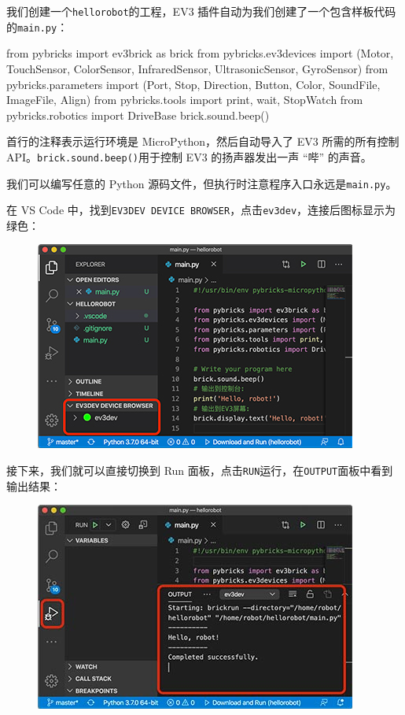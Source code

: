 我们创建一个\texttt{hellorobot}的工程，EV3
插件自动为我们创建了一个包含样板代码的\texttt{main.py}：

\begin{pythoncode}
from pybricks import ev3brick as brick
from pybricks.ev3devices import (Motor, TouchSensor, ColorSensor, InfraredSensor, UltrasonicSensor, GyroSensor)
from pybricks.parameters import (Port, Stop, Direction, Button, Color, SoundFile, ImageFile, Align)
from pybricks.tools import print, wait, StopWatch
from pybricks.robotics import DriveBase
brick.sound.beep()
\end{pythoncode}

首行的注释表示运行环境是 MicroPython，然后自动导入了 EV3 所需的所有控制
API。\texttt{brick.sound.beep()}用于控制 EV3 的扬声器发出一声 ``哔''
的声音。

我们可以编写任意的 Python
源码文件，但执行时注意程序入口永远是\texttt{main.py}。

在 VS Code
中，找到\texttt{EV3DEV\ DEVICE\ BROWSER}，点击\texttt{ev3dev}，连接后图标显示为绿色：

 
 \begin{figure}[htp]
	\centering
	\includegraphics[width=0.6\linewidth]{fig/1346267955331105l.png}
\end{figure}


接下来，我们就可以直接切换到 Run
面板，点击\texttt{RUN}运行，在\texttt{OUTPUT}面板中看到输出结果：

 
 \begin{figure}[htp]
	\centering
	\includegraphics[width=0.6\linewidth]{fig/1346268110520386l.png}
\end{figure}


